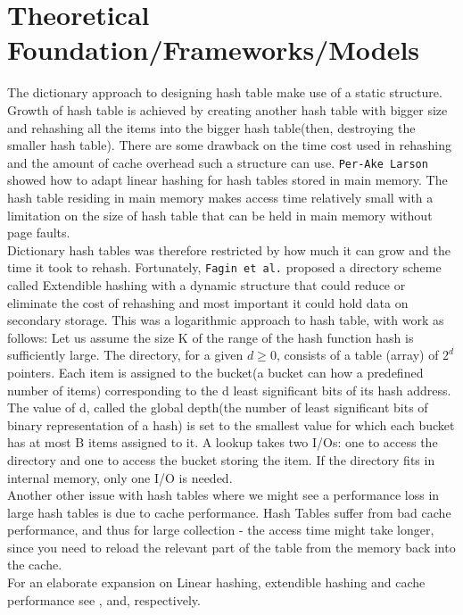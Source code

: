 \documentclass[a4paper,12pt, openany]{book}
\begin{document}
\section{ Theoretical Foundation/Frameworks/Models}
The dictionary approach to designing hash table make use of a static structure. Growth of hash table is achieved by creating another hash table with bigger size and rehashing all the items into the bigger hash table(then, destroying the smaller hash table). There are some drawback on the time cost used in rehashing and the amount of cache overhead such a structure can use. \texttt{Per-Ake Larson} \cite{larson1989dynamic} showed how to adapt linear hashing for hash tables stored in main memory. The hash table residing in main memory makes access time relatively small with a limitation on the size of hash table that can be held in main memory without page faults. \\
Dictionary hash tables was therefore restricted by how much it can grow and the time it took to rehash. Fortunately,  \texttt{Fagin et al.} \cite{vitter2008algorithms} proposed a directory scheme called {Extendible hashing} with a dynamic structure that could reduce or eliminate the cost of rehashing and most important it could hold data on secondary storage. This was a logarithmic approach to hash table, with work as follows: Let us assume the size K of the range of the hash function hash is sufficiently large. The directory, for a given $d \geq 0$, consists of a table (array) of $2 ^ d$ pointers. Each item is assigned to the bucket(a bucket can how a predefined number of items) corresponding to the d least significant bits of its hash address. The value of d, called the global depth(the number of least significant bits of binary representation of a hash) is set to the smallest value for which each bucket has at most B items assigned to it. A lookup takes two I/Os: one to access the directory and one to access the bucket storing the item. If the directory fits in internal memory, only one I/O is needed.\\



Another other issue with hash tables where we might see a performance loss in large hash tables is due to cache performance. Hash Tables suffer from bad cache performance, and thus for large collection - the access time might take longer, since you need to reload the relevant part of the table from the  memory back into the cache. \\

For an elaborate expansion on Linear hashing, extendible hashing and cache performance see  \cite{larson1989dynamic}, \cite{vitter2008algorithms} and, \cite{sachedina2006resizable} respectively.
\end{document}
